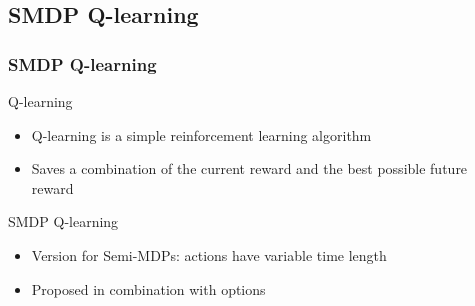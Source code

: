 \documentclass[aspectratio=169]{beamer}
\begin{document}
\subsection{SMDP Q-learning}
\begin{frame}
	\frametitle{SMDP Q-learning \cite{sutton1999between}}
	\begin{block}{Q-learning}
		\begin{itemize}
			\item Q-learning is a simple reinforcement learning algorithm
			\item Saves a combination of the current reward and the best
				possible future reward
		\end{itemize}
	\end{block}
	\begin{block}{SMDP Q-learning}
		\begin{itemize}
			\item Version for Semi-MDPs: actions have variable time length
			\item Proposed in combination with options
		\end{itemize}
	\end{block}
\end{frame}
\end{document}
